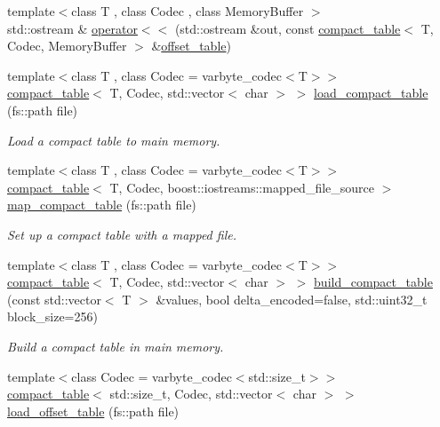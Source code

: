 \begin{DoxyCompactItemize}
\item 
{\footnotesize template$<$class T , class Codec , class Memory\+Buffer $>$ }\\std\+::ostream \& \mbox{\hyperlink{namespaceirk_a2bc6394c2673a19ce5bf0ca74641c41d}{operator$<$$<$}} (std\+::ostream \&out, const \mbox{\hyperlink{classirk_1_1compact__table}{compact\+\_\+table}}$<$ T, Codec, Memory\+Buffer $>$ \&\mbox{\hyperlink{namespaceirk_a3d7b00f359d122e0bf0f709d21f00098}{offset\+\_\+table}})
\item 
{\footnotesize template$<$class T , class Codec  = varbyte\+\_\+codec$<$\+T$>$$>$ }\\\mbox{\hyperlink{classirk_1_1compact__table}{compact\+\_\+table}}$<$ T, Codec, std\+::vector$<$ char $>$ $>$ \mbox{\hyperlink{namespaceirk_aa5a47c5f38246e32ece50c109e1edaaf}{load\+\_\+compact\+\_\+table}} (fs\+::path file)
\begin{DoxyCompactList}\small\item\em Load a compact table to main memory. \end{DoxyCompactList}\item 
{\footnotesize template$<$class T , class Codec  = varbyte\+\_\+codec$<$\+T$>$$>$ }\\\mbox{\hyperlink{classirk_1_1compact__table}{compact\+\_\+table}}$<$ T, Codec, boost\+::iostreams\+::mapped\+\_\+file\+\_\+source $>$ \mbox{\hyperlink{namespaceirk_a72297d13b3e41cd8dafdcc28ff3c4528}{map\+\_\+compact\+\_\+table}} (fs\+::path file)
\begin{DoxyCompactList}\small\item\em Set up a compact table with a mapped file. \end{DoxyCompactList}\item 
{\footnotesize template$<$class T , class Codec  = varbyte\+\_\+codec$<$\+T$>$$>$ }\\\mbox{\hyperlink{classirk_1_1compact__table}{compact\+\_\+table}}$<$ T, Codec, std\+::vector$<$ char $>$ $>$ \mbox{\hyperlink{namespaceirk_ad911a2a5cd8986d97fd92eec33683377}{build\+\_\+compact\+\_\+table}} (const std\+::vector$<$ T $>$ \&values, bool delta\+\_\+encoded=false, std\+::uint32\+\_\+t block\+\_\+size=256)
\begin{DoxyCompactList}\small\item\em Build a compact table in main memory. \end{DoxyCompactList}\item 
{\footnotesize template$<$class Codec  = varbyte\+\_\+codec$<$std\+::size\+\_\+t$>$$>$ }\\\mbox{\hyperlink{classirk_1_1compact__table}{compact\+\_\+table}}$<$ std\+::size\+\_\+t, Codec, std\+::vector$<$ char $>$ $>$ \mbox{\hyperlink{namespaceirk_ad0428139c5d98f138321b9a2b1bff3d5}{load\+\_\+offset\+\_\+table}} (fs\+::path file)

\end{DoxyCompactItemize}

